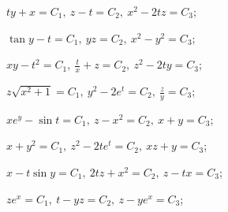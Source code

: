 \begin{enumsols}
		\label{sol:nonlinsys_systodes:systems3}
		\item \( ty + x = C_1, ~ z - t = C_2, ~ x^2 - 2tz = C_3 \); \sfill %
		\item \( \tan{y} - t = C_1, ~ yz = C_2, ~ x^2 - y^2 = C_3 \); \sfill %
		\item \( xy - t^2 = C_1, ~ \frac{t}{x} + z = C_2, ~ z^2 - 2ty = C_3 \); \sfill %
		\item \( z \sqrt{x^2 + 1} = C_1, ~ y^2 - 2 e^t = C_2, ~ \frac{z}{y} = C_3 \); \sfill %
		\item \( x e^y - \sin{t} = C_1, ~ z - x^2 = C_2, ~ x + y = C_3 \); \sfill %
		\item \( x + y^2 = C_1, ~ z^2 - 2te^t = C_2, ~ xz + y = C_3 \); \sfill %
		
		\label{sol:nonlinsys_systodes:systems3_hard}
		\item \( x - t \sin{y} = C_1, ~ 2tz + x^2 = C_2, ~ z - tx = C_3 \); \sfill %
		\item \( ze^x = C_1, ~ t - yz = C_2, ~ z - y e^x = C_3 \); \sfill %


\end{enumsols}
